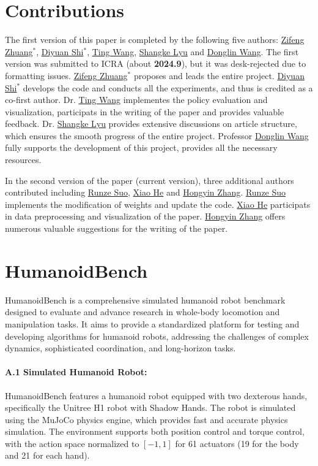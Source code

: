 \section{Contributions}
The first version of this paper is completed by the following five authors: \underline{Zifeng Zhuang$^*$}, \underline{Diyuan Shi$^*$}, \underline{Ting Wang}, \underline{Shangke Lyu} and \underline{Donglin Wang}. 
The first version was submitted to ICRA (about \textbf{2024.9}), but it was desk-rejected due to formatting issues. 
\underline{Zifeng Zhuang$^*$} proposes and leads the entire project. 
\underline{Diyuan Shi$^*$} develops the code and conducts all the experiments, and thus is credited as a co-first author. 
Dr. \underline{Ting Wang} implementes the policy evaluation and visualization, participats in the writing of the paper and provides valuable feedback. 
Dr. \underline{Shangke Lyu} provides extensive discussions on article structure, which ensures the smooth progress of the entire project.
Professor \underline{Donglin Wang} fully supports the development of this project, provides all the necessary resources. 

In the second version of the paper (current version), three additional authors contributed including \underline{Runze Suo}, \underline{Xiao He} and \underline{Hongyin Zhang}. 
\underline{Runze Suo} implements the modification of weights and update the code. 
\underline{Xiao He} participats in data preprocessing and visualization of the paper. 
\underline{Hongyin Zhang} offers numerous valuable suggestions for the writing of the paper.
\section{HumanoidBench}
HumanoidBench \citep{sferrazza2024humanoidbench} is a comprehensive simulated humanoid robot benchmark designed to evaluate and advance research in whole-body locomotion and manipulation tasks. It aims to provide a standardized platform for testing and developing algorithms for humanoid robots, addressing the challenges of complex dynamics, sophisticated coordination, and long-horizon tasks.

\paragraph{A.1 Simulated Humanoid Robot:} HumanoidBench features a humanoid robot equipped with two dexterous hands, specifically the Unitree H1 robot with Shadow Hands. 
The robot is simulated using the MuJoCo physics engine, which provides fast and accurate physics simulation.
The environment supports both position control and torque control, with the action space normalized to $\left[-1,1\right]$ for 61 actuators (19 for the body and 21 for each hand).


